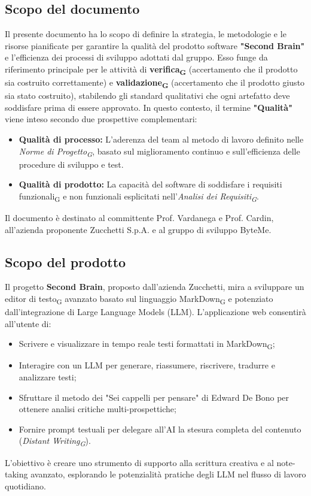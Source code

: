 \documentclass[11pt,a4paper]{article}
\newcommand{\gls}[1]{#1\textsubscript{G}}
\begin{document}
\subsection{Scopo del documento}
Il presente documento ha lo scopo di definire la strategia, le metodologie e le risorse pianificate per garantire la qualità del prodotto software \textbf{"Second Brain"} e l'efficienza dei processi di sviluppo adottati dal gruppo. Esso funge da riferimento principale per le attività di \textbf{\gls{verifica}} (accertamento che il prodotto sia costruito correttamente) e \textbf{\gls{validazione}} (accertamento che il prodotto giusto sia stato costruito), stabilendo gli standard qualitativi che ogni artefatto deve soddisfare prima di essere approvato.
In questo contesto, il termine \textbf{"Qualità"} viene inteso secondo due prospettive complementari:
\begin{itemize}
    \item \textbf{Qualità di processo:} L'aderenza del team al metodo di lavoro definito nelle \textit{\gls{Norme di Progetto}}, basato sul miglioramento continuo e sull'efficienza delle procedure di sviluppo e test.
    \item \textbf{Qualità di prodotto:} La capacità del software di soddisfare i \gls{requisiti funzionali} e non funzionali esplicitati nell'\textit{\gls{Analisi dei Requisiti}}.
\end{itemize}
Il documento è destinato al committente Prof. Vardanega e Prof. Cardin, all'azienda proponente Zucchetti S.p.A. e al gruppo di sviluppo ByteMe.

\subsection{Scopo del prodotto}
Il progetto \textbf{Second Brain}, proposto dall'azienda Zucchetti, mira a sviluppare un \gls{editor di testo} avanzato basato sul linguaggio \gls{MarkDown} e potenziato dall'integrazione di Large Language Models (LLM).
L'applicazione web consentirà all'utente di:
\begin{itemize}
    \item Scrivere e visualizzare in tempo reale testi formattati in \gls{MarkDown};
    \item Interagire con un LLM per generare, riassumere, riscrivere, tradurre e analizzare testi;
    \item Sfruttare il metodo dei "Sei cappelli per pensare" di Edward De Bono per ottenere analisi critiche multi-prospettiche;
    \item Fornire prompt testuali per delegare all'AI la stesura completa del contenuto (\textit{\gls{Distant Writing}}).
\end{itemize}
L'obiettivo è creare uno strumento di supporto alla scrittura creativa e al note-taking avanzato, esplorando le potenzialità pratiche degli LLM nel flusso di lavoro quotidiano.
\end{document}
